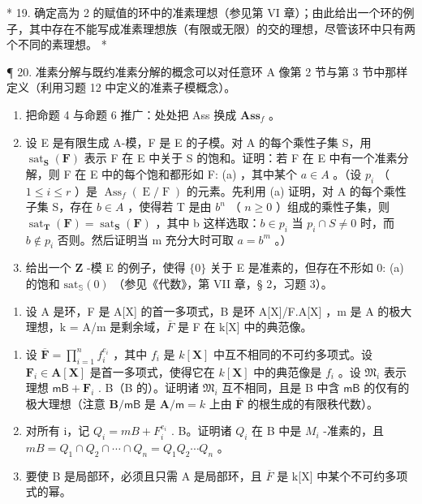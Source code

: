 * 19. 确定高为 2 的赋值的环中的准素理想（参见第 VI 章）；由此给出一个环的例子，其中存在不能写成准素理想族（有限或无限）的交的理想，尽管该环中只有两个不同的素理想。 *

¶ 20. 准素分解与既约准素分解的概念可以对任意环 A 像第 2 节与第 3 节中那样定义（利用习题 12 中定义的准素子模概念）。

\begin{enumerate}
\def\labelenumi{(\alph{enumi})}
\item
  把命题 4 与命题 6 推广：处处把 Ass 换成 \(\mathbf{Ass}_f\) 。
\item
  设 E 是有限生成 A-模，F 是 E 的子模。对 A 的每个乘性子集 S，用 \(\operatorname{sat}_{\mathbf{S}}(\mathbf{F})\) 表示 F 在 E 中关于 S 的饱和。证明：若 F 在 E 中有一个准素分解，则 F 在 E 中的每个饱和都形如 F: (a) ，其中某个 \(a \in A\) 。（设 \(p_{i}\) （ \(1 \leqslant i \leqslant r\) ）是 \(\operatorname{Ass}_{f}(\operatorname{E}/\operatorname{F})\) 的元素。先利用 (a) 证明，对 A 的每个乘性子集 S，存在 \(b \in A\) ，使得若 T 是由 \(b^{n}\) （ \(n \geqslant 0\) ）组成的乘性子集，则 \(\operatorname{sat}_{\mathbf{T}}(\mathbf{F}) = \operatorname{sat}_{\mathbf{S}}(\mathbf{F})\) ，其中 b 这样选取：\(b \in p_{i}\) 当 \(p_{i} \cap S \neq 0\) 时，而 \(b \notin p_{i}\) 否则。然后证明当 m 充分大时可取 \(a = b^{m}\) 。）
\item
  给出一个 \(\mathbf{Z}\) -模 E 的例子，使得 \(\{0\}\) 关于 E 是准素的，但存在不形如 0: (a) 的饱和 \(\mathrm{sat}_{\mathbb{S}}(0)\) （参见《代数》，第 VII 章，§ 2，习题 3）。
\end{enumerate}

\begin{enumerate}
\def\labelenumi{\arabic{enumi}.}
\setcounter{enumi}{20}
\tightlist
\item
  设 A 是环，F 是 A{[}X{]} 的首一多项式，B 是环 A{[}X{]}/F.A{[}X{]} ，m 是 A 的极大理想，k = A/m 是剩余域，\(\bar{F}\) 是 F 在 k{[}X{]} 中的典范像。
\end{enumerate}

\begin{enumerate}
\def\labelenumi{(\alph{enumi})}
\item
  设 \(\overline{\mathbf{F}} = \prod_{i=1}^{n} f_i^{e_i}\) ，其中 \(f_i\) 是 \(k[\mathbf{X}]\) 中互不相同的不可约多项式。设 \(\mathbf{F}_i \in \mathbf{A}[\mathbf{X}]\) 是首一多项式，使得它在 \(k[\mathbf{X}]\) 中的典范像是 \(f_i\) 。设 \(\mathfrak{M}_i\) 表示理想 \(\mathsf{mB} + \mathbf{F}_i\) . B（B 的）。证明诸 \(\mathfrak{M}_i\) 互不相同，且是 B 中含 \(\mathsf{mB}\) 的仅有的极大理想（注意 \(\mathbf{B}/\mathsf{mB}\) 是 \(\mathbf{A}/\mathsf{m} = k\) 上由 \(\overline{\mathbf{F}}\) 的根生成的有限秩代数）。
\item
  对所有 i，记 \(Q_{i} = mB + F_{i}^{e_{i}}\) . B。证明诸 \(Q_{i}\) 在 B 中是 \(M_{i}\) -准素的，且 \(mB = Q_{1} \cap Q_{2} \cap \cdots \cap Q_{n} = Q_{1}Q_{2} \cdots Q_{n}\) 。
\item
  要使 B 是局部环，必须且只需 A 是局部环，且 \(\overline{F}\) 是 k{[}X{]} 中某个不可约多项式的幂。
\end{enumerate}

